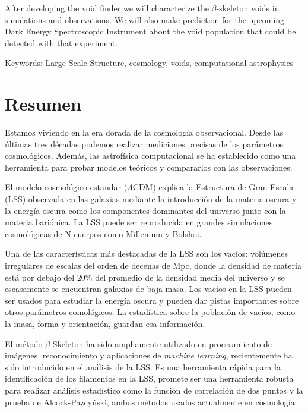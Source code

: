 \documentclass[manuscript]{aastex62}
\begin{document}
  After developing the void finder we will characterize the $\beta$-skeleton voids
  in simulations and observations. We will also make prediction for the upcoming
  Dark Energy Spectroscopic Instrument about the void population that could be detected
  with that experiment.
  

  

  \medskip

  Keywords: Large Scale Structure, cosmology, voids, computational astrophysics

  

  \section*{Resumen}

  Estamos viviendo en la era dorada de la cosmolog\'ia observacional.
  Desde las \'ultimas tres d\'ecadas podemos realizar mediciones precisas
  de los par\'ametros cosmol\'ogicos. Adem\'as,
  las astrof\'isica computacional se ha establecido como una herramienta para probar
  modelos te\'oricos y compararlos con las observaciones.

  El modelo cosmol\'ogico estandar ($\Lambda$CDM) explica la Estructura de Gran
  Escala (LSS) observada en las galaxias mediante la introducci\'on de la materia
  oscura y la energ\'ia oscura como los componentes dominantes del universo
  junto con la materia bari\'onica. La LSS puede ser reproducida en grandes
  simulaciones cosmol\'ogicas de N-cuerpos como Millenium y Bolshoi.

  Una de las caracter\'isticas m\'as destacadas de la LSS son los vac\'ios:
  vol\'umenes irregulares de escalas del orden de decenas de Mpc, donde la
  densidad de materia est\'a por debajo del $20\%$ del promedio de la densidad
  media del universo y se escasamente se encuentran galaxias de baja masa.
  Los vac\'ios en la LSS pueden ser usados para estudiar la energ\'ia oscura y pueden dar
  pistas importantes sobre otros par\'ametros comol\'ogicos.
  La estad\'istica sobre la poblaci\'on de vac\'ios, como la masa,
  forma y orientaci\'on, guardan esa informaci\'on.

  El m\'etodo $\beta$-Skeleton ha sido ampliamente utilizado en procesamiento
  de im\'agenes, reconocimiento y aplicaciones de \textit{machine learning},
  recientemente ha sido introducido en el an\'alisis de la LSS.
  Es una herramienta r\'apida para la identificaci\'on de los filamentos
  en la LSS, promete ser una herramienta robusta para realizar an\'alisis
  estad\'istico como la funci\'on de correlaci\'on de dos puntos y
  la prueba de Alcock-Pazcy\'nski, ambos  m\'etodos usados actualmente en
  cosmolog\'ia.
\end{document}
